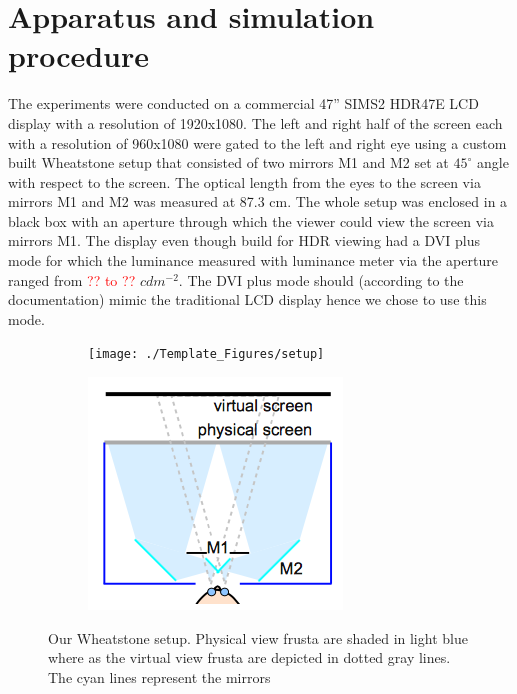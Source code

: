 \section{Apparatus and simulation procedure}
The experiments were conducted on a commercial 47'' SIMS2 HDR47E LCD display with a resolution of 1920x1080. The left and right half of the screen each with a resolution of 960x1080 were gated to the left and right eye using a custom built Wheatstone setup \cite{ wiki:wheatstone} that consisted of two mirrors M1 and M2 set at $45^\circ$ angle with respect to the screen. The optical length from the eyes to the screen via mirrors M1 and M2 was measured at 87.3 cm. The whole setup was enclosed in a black box with an aperture through which the viewer could view the screen via mirrors M1. The display even though build for HDR viewing had a DVI plus mode for which the luminance measured with luminance meter via the aperture ranged from \textcolor{red}{?? to ??} $cdm^{-2}$. The DVI plus mode should (according to the documentation) mimic the traditional LCD display hence we chose to use this mode.
\begin{figure}[htbp]
    \begin{subfigure}[b]{0.5\textwidth}
        \texttt{[image: ./Template\_Figures/setup]}
        \caption{}\label{fig:setup}
    \end{subfigure}
    \begin{subfigure}[b]{0.4\textwidth}
        \includegraphics[width=\textwidth]{./Template_Figures/setup_sch}
        \caption{}\label{fig:setup_sch}
    \end{subfigure}
    \caption{Our Wheatstone setup. Physical view frusta are shaded in light blue where as the virtual view frusta are depicted in dotted gray lines. The cyan lines represent the mirrors \cite{vangorp2014depth}\label{fig:wheatstone_setup}}
\end{figure}

